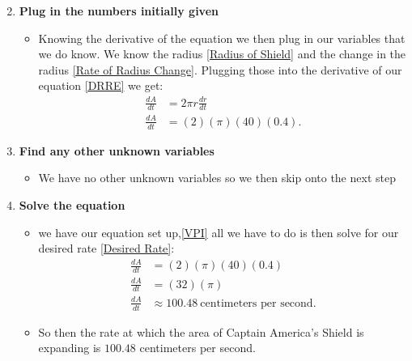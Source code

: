 \documentclass[12pt]{article}
\begin{document}
\begin{enumerate}
\begin{itemize}
\begin{equation}
      \tag{Derivative of Equation} \label{DRRE}
      \end{equation}
    \end{itemize}
  \item \textbf{Plug in the numbers initially given}
    \begin{itemize}
      \item Knowing the derivative of the equation we then plug in our variables that we do know. We know the radius \eqref{Radius of Shield} and the change in the radius \eqref{Rate of Radius Change}. Plugging those into the derivative of our equation \eqref{DRRE} we get:
      \begin{equation}
        \begin{split}
          \frac{dA}{dt} &= 2 \pi r \frac{dr}{dt}\\
          \frac{dA}{dt} &= (2) (\pi) (40) (0.4).
        \end{split}
        \tag{Values evaluated} \label{VPI}
      \end{equation}
    \end{itemize}
  \item \textbf{Find any other unknown variables}
    \begin{itemize}
      \item We have no other unknown variables so we then skip onto the next step
    \end{itemize}
\newpage
  \item \textbf{Solve the equation}
    \begin{itemize}
      \item we have our equation set up,\eqref{VPI} all we have to do is then solve for our desired rate \eqref{Desired Rate}:
      \begin{equation}
        \begin{split}
          \frac{dA}{dt} &= (2) (\pi) (40) (0.4)\\
          \frac{dA}{dt} &= (32) (\pi)\\
          \frac{dA}{dt} &\approx 100.48\ \text{centimeters per second}.
        \end{split}
        \tag{Final Answer} \label{FA}
      \end{equation}
      \item So then the rate at which the area of Captain America's Shield is expanding is $100.48$ centimeters per second.
    \end{itemize}
\end{enumerate}
\end{document}
